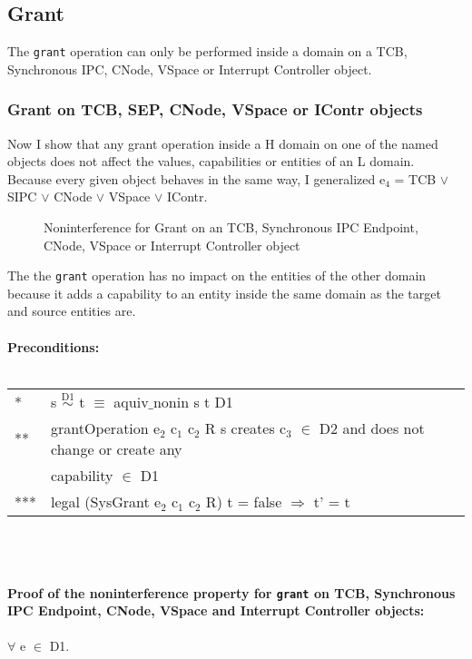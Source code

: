 \subsection{Grant}\label{sec:Grant}
The \texttt{grant} operation can only be performed inside a domain on a TCB, Synchronous IPC, CNode, VSpace or Interrupt Controller object. 
\subsubsection{Grant on TCB, SEP, CNode, VSpace or IContr objects} 
Now I show that any grant operation inside a H domain on one of the named objects does not affect the values, capabilities or entities of an L domain. \\
Because every given object behaves in the same way, I generalized e$_4$ = TCB $\vee$ SIPC $\vee$ CNode $\vee$ VSpace $\vee$ IContr.
\begin{flushleft}
\begin{figure}[H]
\caption{Noninterference for Grant on an TCB, Synchronous IPC Endpoint, CNode, VSpace or Interrupt Controller object}
\end{figure}
\end{flushleft}
The the \texttt{grant} operation has no impact on the entities of the other domain because it adds a capability to an entity inside the same domain as the target and source entities are. \\ \\
\textbf{Preconditions:} \\ \\
\begin{tabular}{ll}
* & s $\overset{\text{D1}}{\sim}$ t $\equiv$ aquiv$\_$nonin s t D1	\\ 
** & grantOperation e$_2$ c$_1$ c$_2$ R s creates c$_3$ $\in$ D2 and does not change or create any \\
& capability $\in$ D1 \\ 
*** & legal (SysGrant e$_2$ c$_1$ c$_2$ R) t = false $\Rightarrow$ t' = t
\end{tabular}\\ \\ \\
\textbf{Proof of the noninterference property for \texttt{grant} on TCB, Synchronous IPC Endpoint, CNode, VSpace and Interrupt Controller objects:}\\ \\
$\forall$ e $\in$ D1. \\ 
